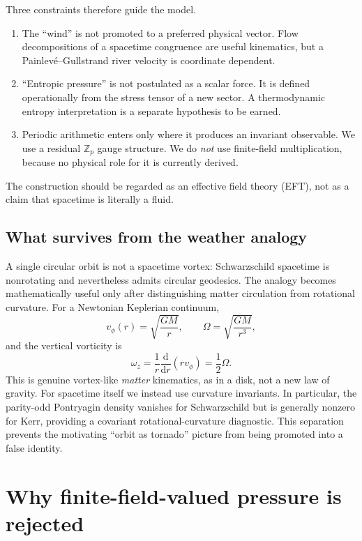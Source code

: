 \documentclass[11pt]{article}
\newcommand{\dd}{\mathrm{d}}
\begin{document}
Three constraints therefore guide the model.
\begin{enumerate}[leftmargin=1.7em]
    \item The ``wind'' is not promoted to a preferred physical vector.  Flow decompositions of a spacetime congruence are useful kinematics, but a Painlev\'e--Gullstrand river velocity is coordinate dependent.
    \item ``Entropic pressure'' is not postulated as a scalar force.  It is defined operationally from the stress tensor of a new sector.  A thermodynamic entropy interpretation is a separate hypothesis to be earned.
    \item Periodic arithmetic enters only where it produces an invariant observable.  We use a residual $\mathbb Z_p$ gauge structure.  We do \emph{not} use finite-field multiplication, because no physical role for it is currently derived.
\end{enumerate}

The construction should be regarded as an effective field theory (EFT), not as a claim that spacetime is literally a fluid.


\subsection{What survives from the weather analogy}
A single circular orbit is not a spacetime vortex: Schwarzschild spacetime is nonrotating and nevertheless admits circular geodesics.  The analogy becomes mathematically useful only after distinguishing matter circulation from rotational curvature.  For a Newtonian Keplerian continuum,
\begin{equation}
v_\phi(r)=\sqrt{\frac{GM}{r}},\qquad
\Omega=\sqrt{\frac{GM}{r^3}},
\end{equation}
and the vertical vorticity is
\begin{equation}
\omega_z=\frac1r\frac{\dd}{\dd r}(rv_\phi)=\frac12\Omega.
\end{equation}
This is genuine vortex-like \emph{matter} kinematics, as in a disk, not a new law of gravity.  For spacetime itself we instead use curvature invariants.  In particular, the parity-odd Pontryagin density vanishes for Schwarzschild but is generally nonzero for Kerr, providing a covariant rotational-curvature diagnostic.  This separation prevents the motivating ``orbit as tornado'' picture from being promoted into a false identity.

\section{Why finite-field-valued pressure is rejected}
\end{document}
